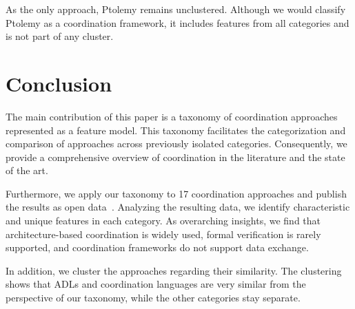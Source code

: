\documentclass[runningheads]{llncs}
\begin{document}
As the only approach, Ptolemy remains unclustered. 
Although we would classify Ptolemy as a coordination framework, it includes features from all categories and is not part of any cluster.

\section{Conclusion} \label{sec: conclusion}

The main contribution of this paper is a taxonomy of coordination approaches represented as a feature model.
This taxonomy facilitates the categorization and comparison of approaches across previously isolated categories.
Consequently, we provide a comprehensive overview of coordination in the literature and the state of the art.

Furthermore, we apply our taxonomy to 17 coordination approaches and publish the results as open data~\cite{krauterCoordination2024Artifacts2024}.
Analyzing the resulting data, we identify characteristic and unique features in each category.
As overarching insights, we find that architecture-based coordination is widely used, formal verification is rarely supported, and coordination frameworks do not support data exchange.

In addition, we cluster the approaches regarding their similarity.
The clustering shows that ADLs and coordination languages are very similar from the perspective of our taxonomy, while the other categories stay separate.



\end{document}
